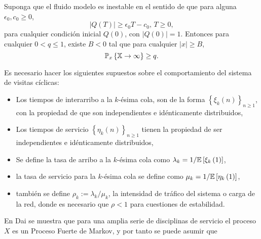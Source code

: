 \begin{Teo}\label{Tma2.2.Down}
Suponga que el fluido modelo es inestable en el sentido de que
para alguna $\epsilon_{0},c_{0}\geq0$,
\begin{equation}\label{Eq.Inestability}
|Q\left(T\right)|\geq\epsilon_{0}T-c_{0}\textrm{,   }T\geq0,
\end{equation}
para cualquier condici\'on inicial $Q\left(0\right)$, con
$|Q\left(0\right)|=1$. Entonces para cualquier $0<q\leq1$, existe
$B<0$ tal que para cualquier $|x|\geq B$,
\begin{equation}
\mathbb{P}_{x}\left\{\mathbb{X}\rightarrow\infty\right\}\geq q.
\end{equation}
\end{Teo}



Es necesario hacer los siguientes supuestos sobre el
comportamiento del sistema de visitas c\'iclicas:
\begin{itemize}
\item Los tiempos de interarribo a la $k$-\'esima cola, son de la
forma $\left\{\xi_{k}\left(n\right)\right\}_{n\geq1}$, con la
propiedad de que son independientes e id{\'e}nticamente
distribuidos,
\item Los tiempos de servicio
$\left\{\eta_{k}\left(n\right)\right\}_{n\geq1}$ tienen la
propiedad de ser independientes e id{\'e}nticamente distribuidos,
\item Se define la tasa de arribo a la $k$-{\'e}sima cola como
$\lambda_{k}=1/\mathbb{E}\left[\xi_{k}\left(1\right)\right]$,
\item la tasa de servicio para la $k$-{\'e}sima cola se define
como $\mu_{k}=1/\mathbb{E}\left[\eta_{k}\left(1\right)\right]$,
\item tambi{\'e}n se define $\rho_{k}:=\lambda_{k}/\mu_{k}$, la
intensidad de tr\'afico del sistema o carga de la red, donde es
necesario que $\rho<1$ para cuestiones de estabilidad.
\end{itemize}



En Dai \cite{Dai} se muestra que para una amplia serie de disciplinas
de servicio el proceso $X$ es un Proceso Fuerte de
Markov, y por tanto se puede asumir que


